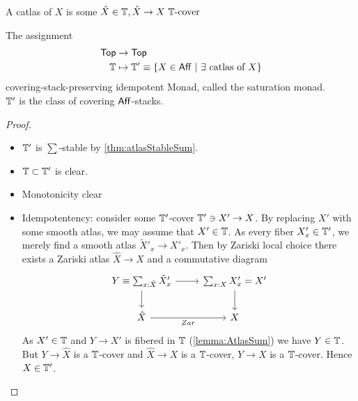 \begin{definition}
	A catlas of $X$ is  some $\hat X \in \mathbb{T} , \hat X \to X \text{ $\mathbb{T}$-cover }$
\end{definition}
\begin{prop}
	The assignment
	\begin{align*}
		\operatorname{\mathsf{Top}} &\to \operatorname{\mathsf{Top}} \\
		\mathbb{T} &\mapsto \mathbb{T}' \equiv \{X \in \mathsf{Aff} \ | \  \exists \text{ catlas of } X \}
	\end{align*}
	covering-stack-preserving idempotent Monad, called the saturation monad. \\
	$\mathbb{T}'$ is the class of covering $\mathsf{Aff}$-stacks.
\end{prop}
\begin{proof}
	\begin{itemize}
		\item 	$\mathbb{T}'$ is $\sum$-stable by \ref{thm:atlasStableSum}. \\
		\item $\mathbb{T} \subset \mathbb{T}'$ is clear.
		\item Monotonicity clear
		\item Idempotentency:  consider some $\mathbb{T}'$-cover $\mathbb{T}' \ni X' \to X$. By replacing $X'$ with some smooth atlas, we may assume that $X' \in \mathbb{T}$. As every fiber $X'_x \in \mathbb{T}'$, we merely find a smooth atlas $\tilde X'_x \to X'_x$. Then by Zariski local choice there exists a Zariski atlas $\hat X \to X$ and a commutative diagram 
		\[\begin{tikzcd}
			Y \equiv {\sum_{x : \hat X}\tilde X'_x} & {\sum_{x : X}X'_x} = X' \\
			{\hat X} & X
			\arrow[from=1-1, to=1-2]
			\arrow[from=1-1, to=2-1]
			\arrow[from=1-2, to=2-2]
			\arrow["Zar"', from=2-1, to=2-2]
		\end{tikzcd}\]
		As $X' \in \mathbb{T}$ and $Y \to X'$ is fibered in $\mathbb{T}$ (\ref{lemma:AtlasSum}) we have $Y \in \mathbb{T}$. But $Y \to \hat X$ is a $\mathbb{T}$-cover and $\hat X \to X$ is a $\mathbb{T}$-cover, $Y \to X$ is a $\mathbb{T}$-cover. Hence $X \in \mathbb{T}'$.
		

\end{itemize}
\end{proof}
